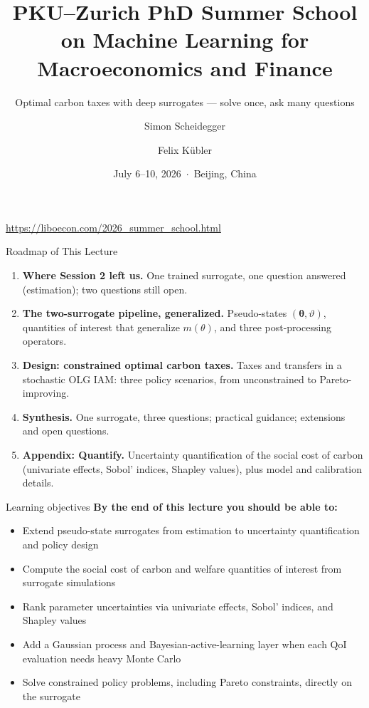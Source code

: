 \documentclass[10pt,aspectratio=169]{beamer}
\title[PKU--Zurich Summer School 2026]
{PKU--Zurich PhD Summer School on Machine Learning for Macroeconomics and Finance}
\subtitle{Optimal carbon taxes with deep surrogates --- solve once, ask many questions}
\author{Simon Scheidegger \and Felix K\"ubler}
\institute{HEC Lausanne $\cdot$ University of Zurich}
\date{July 6--10, 2026 \,$\cdot$\, Beijing, China}
\begin{document}

{
\begin{frame}
\titlepage
\vspace{-0.3cm}
\begin{center}
{\footnotesize \url{https://liboecon.com/2026_summer_school.html}}
\end{center}
\end{frame}
}

\begin{frame}{Roadmap of This Lecture}
\small
\begin{enumerate}
    \item \textbf{Where Session 2 left us.} One trained surrogate, one question answered (estimation); two questions still open.
    \vspace{0.2em}
    \item \textbf{The two-surrogate pipeline, generalized.} Pseudo-states $(\bm{\theta}, \vartheta)$, quantities of interest that generalize $m(\theta)$, and three post-processing operators.
    \vspace{0.2em}
    \item \textbf{Design: constrained optimal carbon taxes.} Taxes and transfers in a stochastic OLG IAM: three policy scenarios, from unconstrained to Pareto-improving.
    \vspace{0.2em}
    \item \textbf{Synthesis.} One surrogate, three questions; practical guidance; extensions and open questions.
    \vspace{0.2em}
    \item \textbf{Appendix: Quantify.} Uncertainty quantification of the social cost of carbon (univariate effects, Sobol' indices, Shapley values), plus model and calibration details.
\end{enumerate}
\end{frame}

\begin{frame}{Learning objectives}
\textbf{By the end of this lecture you should be able to:}
\begin{itemize}
  \item Extend pseudo-state surrogates from estimation to uncertainty quantification and policy design
  \item Compute the social cost of carbon and welfare quantities of interest from surrogate simulations
  \item Rank parameter uncertainties via univariate effects, Sobol' indices, and Shapley values
  \item Add a Gaussian process and Bayesian-active-learning layer when each QoI evaluation needs heavy Monte Carlo
  \item Solve constrained policy problems, including Pareto constraints, directly on the surrogate
\end{itemize}
\end{frame}
\end{document}
